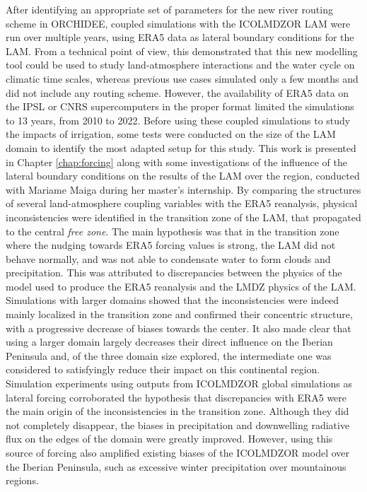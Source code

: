 After identifying an appropriate set of parameters for the new river routing scheme in ORCHIDEE, coupled simulations with the ICOLMDZOR LAM were run over multiple years, using ERA5 data as lateral boundary conditions for the LAM.
From a technical point of view, this demonstrated that this new modelling tool could be used to study land-atmosphere interactions and the water cycle on climatic time scales, whereas previous use cases simulated only a few months and did not include any routing scheme.
However, the availability of ERA5 data on the IPSL or CNRS supercomputers in the proper format limited the simulations to 13 years, from 2010 to 2022. 
Before using these coupled simulations to study the impacts of irrigation, some tests were conducted on the size of the LAM domain to identify the most adapted setup for this study. 
This work is presented in Chapter \ref{chap:forcing} along with some investigations of the influence of the lateral boundary conditions on the results of the LAM over the region, conducted with Mariame Maiga during her master's internship. 
By comparing the structures of several land-atmosphere coupling variables with the ERA5 reanalysis, physical inconsistencies were identified in the transition zone of the LAM, that propagated to the central \textit{free zone}.
The main hypothesis was that in the transition zone where the nudging towards ERA5 forcing values is strong, the LAM did not behave normally, and was not able to condensate water to form clouds and precipitation. This was attributed to discrepancies between the physics of the model used to produce the ERA5 reanalysis and the LMDZ physics of the LAM.  
Simulations with larger domains showed that the inconsistencies were indeed mainly localized in the transition zone and confirmed their concentric structure, with a progressive decrease of biases towards the center. It also made clear that using a larger domain largely decreases their direct influence on the Iberian Peninsula and, of the three domain size explored, the intermediate one was considered to satisfyingly reduce their impact on this continental region.
Simulation experiments using outputs from ICOLMDZOR global simulations as lateral forcing corroborated the hypothesis that discrepancies with ERA5 were the main origin of the inconsistencies in the transition zone. Although they did not completely disappear, the biases in precipitation and downwelling radiative flux on the edges of the domain were greatly improved. However, using this source of forcing also amplified existing biases of the ICOLMDZOR model over the Iberian Peninsula, such as excessive winter precipitation over mountainous regions.
